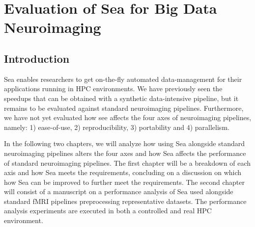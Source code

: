 \part{Evaluation of Sea for Big Data Neuroimaging}
\chapter{Introduction}

Sea enables researchers to get on-the-fly automated data-management for their
applications running in HPC environments. We have previously seen the speedups that
can be obtained with a synthetic data-intensive pipeline, but it remains to be evaluated
against standard neuroimaging pipelines. Furthermore, we have not yet evaluated how see affects
the four axes of neuroimaging pipelines, namely: 1) ease-of-use, 2) reproducibility,
3) portability and 4) parallelism.

In the following two chapters, we will analyze how using Sea alongside standard neuroimaging
pipelines alters the four axes and how Sea affects the performance of standard neuroimaging pipelines.
The first chapter will be a breakdown of each axis and how Sea meets the requirements, concluding
on a discussion on which how Sea can be improved to further meet the requirements. The second chapter
will consist of a manuscript on a performance analysis of Sea used alongside standard fMRI pipelines
preprocessing representative datasets. The performance analysis experiments are executed in both a controlled and
real HPC environment.